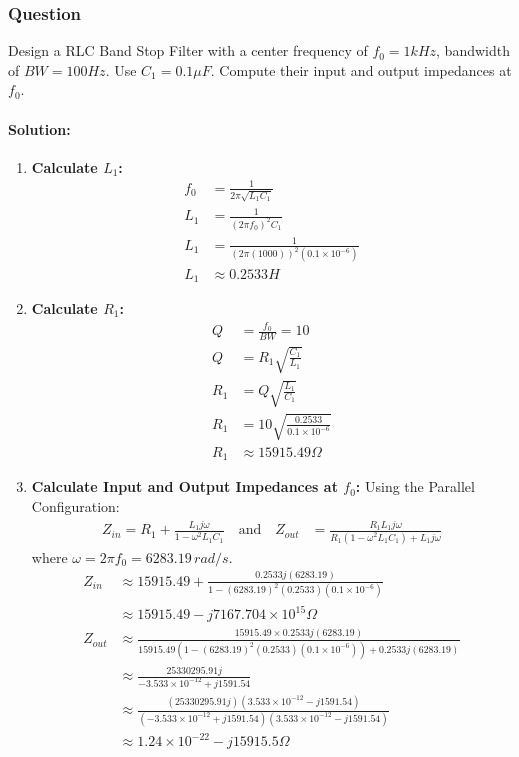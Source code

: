 \subsubsection{Question}
Design a RLC Band Stop Filter with a center frequency of
\(f_0 = 1kHz\), bandwidth of \(BW = 100Hz\). Use \(C_1 = 0.1\mu F\).
Compute their input and output impedances at \(f_0\).
\paragraph{Solution:}
\begin{enumerate}
  \item \textbf{Calculate \(L_1\):}
    \begin{align*}
      f_0 &= \frac{1}{2\pi\sqrt{L_1 C_1}} \\
      L_1 &= \frac{1}{(2\pi f_0)^2 C_1} \\
      L_1 &= \frac{1}{(2\pi (1000))^2 (0.1 \times 10^{-6})} \\
      L_1 &\approx 0.2533 H
    \end{align*}
  \item \textbf{Calculate \(R_1\):}
    \begin{align*}
      Q &= \frac{f_0}{BW} = 10 \\
      Q &= R_1 \sqrt{\frac{C_1}{L_1}} \\
      R_1 &= Q \sqrt{\frac{L_1}{C_1}} \\
      R_1 &= 10 \sqrt{\frac{0.2533}{0.1 \times 10^{-6}}} \\
      R_1 &\approx 15915.49 \Omega
    \end{align*}
  \item \textbf{Calculate Input and Output Impedances at \(f_0\):}
    Using the Parallel Configuration:
    \begin{align*}
      Z_{in} = R_1 + \frac{L_1 j \omega}{1 - \omega^2 L_1 C_1}
      \quad \text{and} \quad
      Z_{out} &= \frac{R_1 L_1 j \omega}{R_1(1 - \omega^2 L_1 C_1) + L_1 j \omega}
    \end{align*}
    where \(\omega = 2 \pi f_0 = 6283.19 \, rad/s\).
    \begin{align*}
      Z_{in} &\approx 15915.49 + \frac{0.2533 j (6283.19)}{1 - (6283.19)^2 (0.2533)(0.1 \times 10^{-6})} \\
              &\approx 15915.49 - j 7167.704 \times 10^{15} \Omega \\
      Z_{out} &\approx \frac{15915.49 \times 0.2533 j (6283.19)}{15915.49(1 - (6283.19)^2 (0.2533)(0.1 \times 10^{-6})) + 0.2533 j (6283.19)} \\
              &\approx \frac{25330295.91 j}{-3.533 \times 10^{-12} + j 1591.54} \\
              &\approx \frac{(25330295.91 j)(3.533 \times 10^{-12} - j 1591.54)}{(-3.533 \times 10^{-12} + j 1591.54)(3.533 \times 10^{-12} - j 1591.54)} \\
              &\approx 1.24 \times 10^{-22} - j 15915.5 \Omega
    \end{align*}
\end{enumerate}
